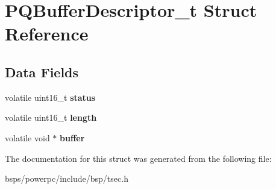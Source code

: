 \hypertarget{structPQBufferDescriptor__t}{}\section{P\+Q\+Buffer\+Descriptor\+\_\+t Struct Reference}
\label{structPQBufferDescriptor__t}
\subsection*{Data Fields}
\begin{DoxyCompactItemize}
\item 
\mbox{\label{structPQBufferDescriptor__t_afae1c5a4d2c6cbeffbfb152e2410ea95}} 
volatile uint16\+\_\+t {\bfseries status}
\item 
\mbox{\label{structPQBufferDescriptor__t_a5a2c7f7bca6ddb33b501279a7a47d6b2}} 
volatile uint16\+\_\+t {\bfseries length}
\item 
\mbox{\label{structPQBufferDescriptor__t_a7dae153a7e3ffe264ad084ccda22fe26}} 
volatile void $\ast$ {\bfseries buffer}
\end{DoxyCompactItemize}


The documentation for this struct was generated from the following file\+:\begin{DoxyCompactItemize}
\item 
bsps/powerpc/include/bsp/tsec.\+h\end{DoxyCompactItemize}
